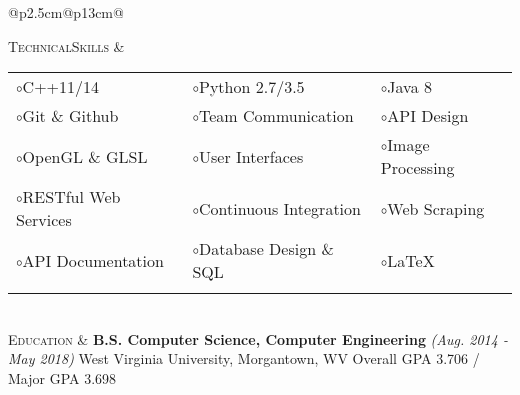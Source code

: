 \documentclass{article}
\begin{document}
\begin{tabular}{@{}p{2.5cm}@{\hspace{0.2cm}}p{13cm}@{}}

\vspace*{-3.0em}\textsc{Technical}\newline\textsc{Skills} &
\setlength{\tabcolsep}{12pt}
\begin{tabular}{@{}lll@{}}

$\circ$\enspace C++11/14 &
$\circ$\enspace Python 2.7/3.5 &
$\circ$\enspace Java 8 \\

$\circ$\enspace Git \& Github &
$\circ$\enspace Team Communication &
$\circ$\enspace API Design \\

$\circ$\enspace OpenGL \& GLSL &
$\circ$\enspace User Interfaces &
$\circ$\enspace Image Processing \\

$\circ$\enspace RESTful Web Services  &
$\circ$\enspace Continuous Integration &
$\circ$\enspace Web Scraping \\

$\circ$\enspace API Documentation &
$\circ$\enspace Database Design \& SQL &
$\circ$\enspace \LaTeX \\

\newline
\end{tabular} \\


\textsc{Education} &
\textbf{B.S. Computer Science, Computer Engineering}
\hfill\small\textit{(Aug. 2014 - May 2018)}\normalsize
\newline West Virginia University, Morgantown, WV \small
\newline Overall GPA 3.706 / Major GPA 3.698
\newline
\normalsize \\



\end{tabular}
\end{document}
